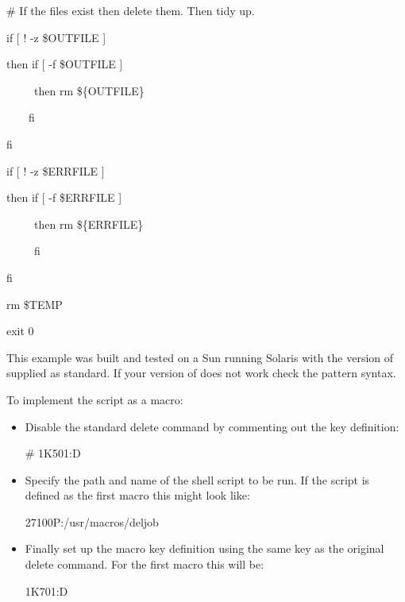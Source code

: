 \begin{exparasmall}
\bigskip

\# If the files exist then delete them. Then tidy up.

\bigskip

if [ ! -z {\textquotedbl}\$OUTFILE{\textquotedbl} ]

then if [ -f {\textquotedbl}\$OUTFILE{\textquotedbl} ]

\ \ \ \ \ then rm \$\{OUTFILE\}

\ \ \ \ fi

fi

\bigskip

if [ ! -z {\textquotedbl}\$ERRFILE{\textquotedbl} ]

then if [ -f {\textquotedbl}\$ERRFILE{\textquotedbl} ]

\ \ \ \ \ then rm \$\{ERRFILE\}

\ \ \ \ \ fi

fi

\bigskip

rm \$TEMP

exit 0

\end{exparasmall}

This example was built and tested on a Sun running Solaris with the version of  supplied as standard. If your
version of  does not work check the pattern syntax.

To implement the script as a macro:

\begin{itemize}
\item Disable the standard delete command by commenting out the key definition:

\begin{expara}

\# 1K501:D

\end{expara}

\item Specify the path and name of the shell script to be run. If the script is defined as the first macro this might look like:

\begin{expara}

27100P:/usr/macros/deljob

\end{expara}

\item Finally set up the macro key definition using the same key as the original delete command. For the first macro this will be:

\begin{expara}

1K701:D

\end{expara}
\end{itemize}

